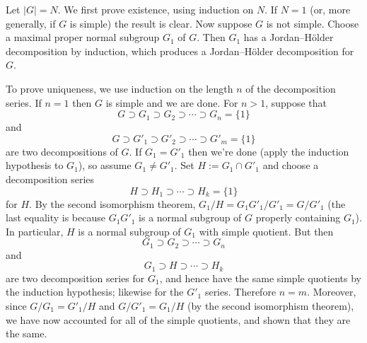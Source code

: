 \documentclass[12pt]{article}
\begin{document}
Let $|G| = N$. We first prove existence, using induction on $N$. If $N=1$ (or, more generally, if $G$ is simple) the result is clear. Now suppose $G$ is not simple. Choose a maximal proper normal subgroup $G_1$ of $G$. Then $G_1$ has a Jordan--H\"older decomposition by induction, which produces a Jordan--H\"older decomposition for $G$.

To prove uniqueness, we use induction on the length $n$ of the decomposition series. If $n=1$ then $G$ is simple and we are done. For $n>1$, suppose that
$$
G \supset G_1 \supset G_2 \supset \cdots \supset G_n = \{1\}
$$
and
$$
G \supset G'_1 \supset G'_2 \supset \cdots \supset G'_m = \{1\}
$$
are two decompositions of $G$. If $G_1 = G'_1$ then we're done (apply the induction hypothesis to $G_1$), so assume $G_1 \neq G'_1$. Set $H := G_1 \cap G'_1$ and choose a decomposition series
$$
H \supset H_1 \supset \cdots \supset H_k = \{1\}
$$
for $H$. By the second isomorphism theorem, $G_1/H = G_1 G'_1/G'_1 = G/G'_1$ (the last equality is because $G_1 G'_1$ is a normal subgroup of $G$ properly containing $G_1$). In particular, $H$ is a normal subgroup of $G_1$ with simple quotient. But then
$$
G_1 \supset G_2 \supset \cdots \supset G_n
$$
and
$$
G_1 \supset H \supset \cdots \supset H_k
$$
are two decomposition series for $G_1$, and hence have the same simple quotients by the induction hypothesis; likewise for the $G'_1$ series. Therefore $n=m$. Moreover, since $G/G_1 = G'_1/H$ and $G/G'_1 = G_1/H$ (by the second isomorphism theorem), we have now accounted for all of the simple quotients, and shown that they are the same.
\end{document}
